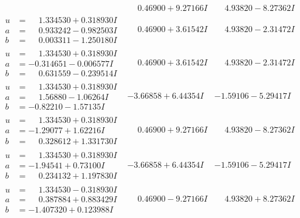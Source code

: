 \documentclass[1p]{elsarticle_modified}
\theoremstyle{definition}
\begin{document}
$$\begin{array}{c|c|c}
 & \phantom{-}0.46900 + 9.27166 I & \phantom{-}4.93820 - 8.27362 I \\ \hline\begin{aligned}
u &= \phantom{-}1.334530 + 0.318930 I \\
a &= \phantom{-}0.933242 - 0.982503 I \\
b &= \phantom{-}0.003311 - 1.250180 I\end{aligned}
 & \phantom{-}0.46900 + 3.61542 I & \phantom{-}4.93820 - 2.31472 I \\ \hline\begin{aligned}
u &= \phantom{-}1.334530 + 0.318930 I \\
a &= -0.314651 - 0.006577 I \\
b &= \phantom{-}0.631559 - 0.239514 I\end{aligned}
 & \phantom{-}0.46900 + 3.61542 I & \phantom{-}4.93820 - 2.31472 I \\ \hline\begin{aligned}
u &= \phantom{-}1.334530 + 0.318930 I \\
a &= \phantom{-}1.56880 - 1.06264 I \\
b &= -0.82210 - 1.57135 I\end{aligned}
 & -3.66858 + 6.44354 I & -1.59106 - 5.29417 I \\ \hline\begin{aligned}
u &= \phantom{-}1.334530 + 0.318930 I \\
a &= -1.29077 + 1.62216 I \\
b &= \phantom{-}0.328612 + 1.331730 I\end{aligned}
 & \phantom{-}0.46900 + 9.27166 I & \phantom{-}4.93820 - 8.27362 I \\ \hline\begin{aligned}
u &= \phantom{-}1.334530 + 0.318930 I \\
a &= -1.94541 + 0.73100 I \\
b &= \phantom{-}0.234132 + 1.197830 I\end{aligned}
 & -3.66858 + 6.44354 I & -1.59106 - 5.29417 I \\ \hline\begin{aligned}
u &= \phantom{-}1.334530 - 0.318930 I \\
a &= \phantom{-}0.387884 + 0.883429 I \\
b &= -1.407320 + 0.123988 I\end{aligned}
 & \phantom{-}0.46900 - 9.27166 I & \phantom{-}4.93820 + 8.27362 I \\ \hline\begin{aligned}

\end{aligned}
\end{array}$$
\end{document}
